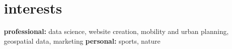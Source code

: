 \documentclass[]{friggeri-cv-a4}
\begin{document}

\section{interests}

\textbf{professional:} data science, website creation, mobility and urban planning, geospatial data, marketing \textbf{personal:} sports, nature 


\end{document}

